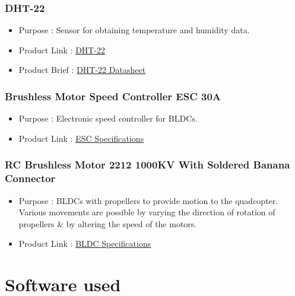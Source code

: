 \documentclass[a4paper,12pt,oneside]{book}
\begin{document}
 \subsubsection{DHT-22} 

\begin{itemize}
  \item Purpose : Sensor for obtaining temperature and humidity data. 
  \item Product Link : \href{https://www.amazon.in/Generic-Digital-Temperature-Humidity-Sensor/dp/B00O8RIYYU}{DHT-22} 
  \item Product Brief : \href{https://www.sparkfun.com/datasheets/Sensors/Temperature/DHT22.pdf}{DHT-22 Datasheet} 
 \end{itemize}
 
  \subsubsection{Brushless Motor Speed Controller ESC 30A} 

\begin{itemize}
  \item Purpose : Electronic speed controller for BLDCs.
  \item Product Link : \href{https://robokits.co.in/quadrotors-hexarotors-drones/brushless-motors-esc/brushless-motor-speed-controller-esc-30a/}{ESC Specifications} 
 \end{itemize}

\subsubsection{RC Brushless Motor 2212 1000KV With Soldered Banana Connector} 

\begin{itemize}
  \item Purpose : BLDCs with propellers to provide motion to the quadcopter. Various movements are possible by varying the direction of rotation of propellers \& by altering the speed of the motors.

 
  \item Product Link : \href{https://robokits.co.in/quadrotors-hexarotors-drones/brushless-motors-esc/brushless-motor-speed-controller-esc-30a/}{BLDC Specifications} 
 \end{itemize}

\section{Software used}
\end{document}
